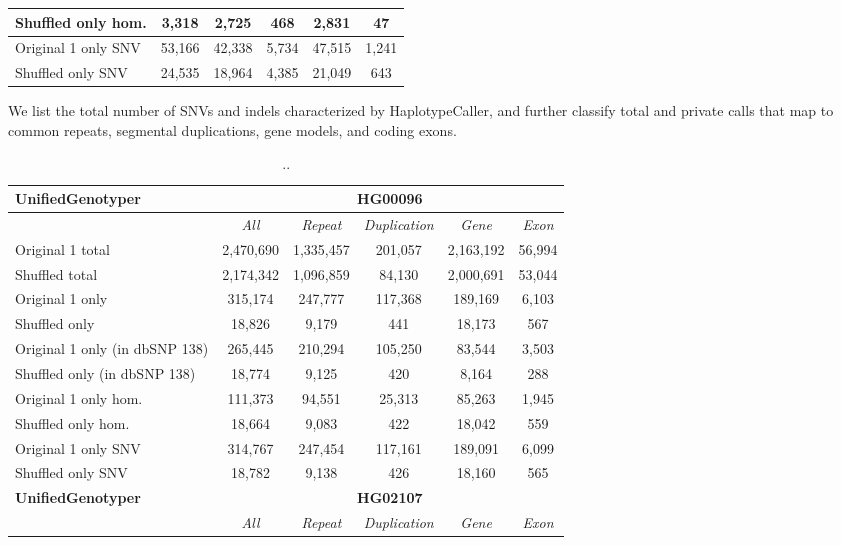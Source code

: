 \begin{table}[htb]
\begin{center}
\begin{tabular}{|l|c||c|c|c|c|}
\hline
Shuffled only hom. & 3,318 & 2,725 & 468 & 2,831 & 47 \\
\hline
Original 1 only SNV & 53,166 & 42,338 & 5,734 & 47,515 & 1,241 \\
\hline
Shuffled only SNV & 24,535 & 18,964 & 4,385 & 21,049 & 643 \\ 
\hline
\end{tabular}
\end{center}
{\footnotesize We list the total number of SNVs and indels characterized by HaplotypeCaller, and further classify total and private calls that map to common repeats, segmental duplications, gene models, and coding exons.}
\label{tab:orig-vs-shuf-hc}
\end{table}

\begin{table}[htb]
\caption{ .. }
\begin{center}
\begin{tabular}{|l|c||c|c|c|c|}
\hline
{\bf UnifiedGenotyper} & \multicolumn{5}{|c|}{\bf HG00096} \\
\hline
\cline{2-6}
{\bf} & {\it All} & {\it Repeat} & {\it Duplication} & {\it Gene} & {\it Exon} \\
\hline
Original 1 total & 2,470,690 & 1,335,457 & 201,057 & 2,163,192 & 56,994 \\
\hline
Shuffled total & 2,174,342 & 1,096,859 & 84,130 & 2,000,691 & 53,044 \\
\hline
Original 1 only & 315,174 & 247,777 & 117,368 & 189,169 & 6,103 \\
\hline
Shuffled only & 18,826 & 9,179 & 441 & 18,173 & 567 \\
\hline
Original 1 only (in dbSNP 138) & 265,445 & 210,294 & 105,250 & 83,544 & 3,503 \\
\hline
Shuffled only (in dbSNP 138) & 18,774 & 9,125 & 420 & 8,164 & 288 \\
\hline
Original 1 only hom. & 111,373 & 94,551 & 25,313 & 85,263 & 1,945 \\
\hline
Shuffled only hom. & 18,664 & 9,083 & 422 & 18,042 & 559 \\
\hline
Original 1 only SNV & 314,767 & 247,454 & 117,161 & 189,091 & 6,099 \\
\hline
Shuffled only SNV & 18,782 & 9,138 & 426 & 18,160 & 565 \\ 
\hline
\hline
{\bf UnifiedGenotyper} & \multicolumn{5}{|c|}{\bf HG02107} \\
\hline
\cline{2-6}
{\bf} & {\it All} & {\it Repeat} & {\it Duplication} & {\it Gene} & {\it Exon} \\

\end{tabular}
\end{center}
\end{table}
